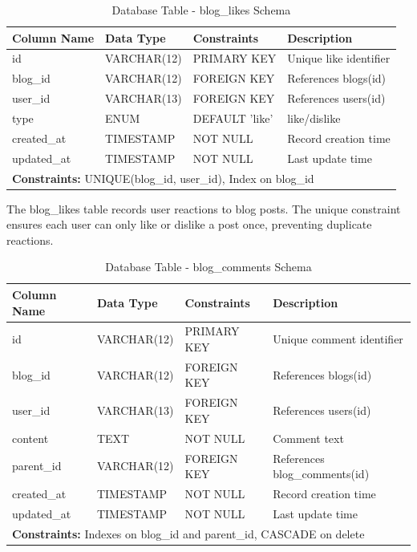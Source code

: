 \documentclass[12pt,a4paper]{report}
\newcommand{\JustifiedNormal}{\fontsize{12}{14}\selectfont\justifying\setlength{\parindent}{0pt}}
\begin{document}
\begin{table}[H]
\centering
\caption{Database Table - blog\_likes Schema}
\small
\begin{tabular}{|p{3.5cm}|p{3cm}|p{3cm}|p{4cm}|}
\hline
\textbf{Column Name} & \textbf{Data Type} & \textbf{Constraints} & \textbf{Description} \\
\hline
id & VARCHAR(12) & PRIMARY KEY & Unique like identifier \\
\hline
blog\_id & VARCHAR(12) & FOREIGN KEY & References blogs(id) \\
\hline
user\_id & VARCHAR(13) & FOREIGN KEY & References users(id) \\
\hline
type & ENUM & DEFAULT 'like' & like/dislike \\
\hline
created\_at & TIMESTAMP & NOT NULL & Record creation time \\
\hline
updated\_at & TIMESTAMP & NOT NULL & Last update time \\
\hline
\multicolumn{4}{|l|}{\textbf{Constraints:} UNIQUE(blog\_id, user\_id), Index on blog\_id} \\
\hline
\end{tabular}
\end{table}

\JustifiedNormal
The blog\_likes table records user reactions to blog posts. The unique constraint ensures each user can only like or dislike a post once, preventing duplicate reactions.

\begin{table}[H]
\centering
\caption{Database Table - blog\_comments Schema}
\small
\begin{tabular}{|p{3.5cm}|p{3cm}|p{3cm}|p{4cm}|}
\hline
\textbf{Column Name} & \textbf{Data Type} & \textbf{Constraints} & \textbf{Description} \\
\hline
id & VARCHAR(12) & PRIMARY KEY & Unique comment identifier \\
\hline
blog\_id & VARCHAR(12) & FOREIGN KEY & References blogs(id) \\
\hline
user\_id & VARCHAR(13) & FOREIGN KEY & References users(id) \\
\hline
content & TEXT & NOT NULL & Comment text \\
\hline
parent\_id & VARCHAR(12) & FOREIGN KEY & References blog\_comments(id) \\
\hline
created\_at & TIMESTAMP & NOT NULL & Record creation time \\
\hline
updated\_at & TIMESTAMP & NOT NULL & Last update time \\
\hline
\multicolumn{4}{|l|}{\textbf{Constraints:} Indexes on blog\_id and parent\_id, CASCADE on delete} \\
\hline
\end{tabular}
\end{table}
\end{document}
